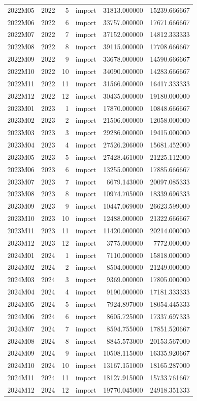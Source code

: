 \begin{tabular}{lrrlrr}
2022M05 & 2022 & 5 & import & 31813.000000 & 15239.666667 \\
2022M06 & 2022 & 6 & import & 33757.000000 & 17671.666667 \\
2022M07 & 2022 & 7 & import & 37152.000000 & 14812.333333 \\
2022M08 & 2022 & 8 & import & 39115.000000 & 17708.666667 \\
2022M09 & 2022 & 9 & import & 33678.000000 & 14590.666667 \\
2022M10 & 2022 & 10 & import & 34090.000000 & 14283.666667 \\
2022M11 & 2022 & 11 & import & 31566.000000 & 16417.333333 \\
2022M12 & 2022 & 12 & import & 30435.000000 & 19180.000000 \\
2023M01 & 2023 & 1 & import & 17870.000000 & 10848.666667 \\
2023M02 & 2023 & 2 & import & 21506.000000 & 12058.000000 \\
2023M03 & 2023 & 3 & import & 29286.000000 & 19415.000000 \\
2023M04 & 2023 & 4 & import & 27526.206000 & 15681.452000 \\
2023M05 & 2023 & 5 & import & 27428.461000 & 21225.112000 \\
2023M06 & 2023 & 6 & import & 13255.000000 & 17885.666667 \\
2023M07 & 2023 & 7 & import & 6679.143000 & 20097.085333 \\
2023M08 & 2023 & 8 & import & 10974.705000 & 18339.696333 \\
2023M09 & 2023 & 9 & import & 10447.069000 & 26623.599000 \\
2023M10 & 2023 & 10 & import & 12488.000000 & 21322.666667 \\
2023M11 & 2023 & 11 & import & 11420.000000 & 20214.000000 \\
2023M12 & 2023 & 12 & import & 3775.000000 & 7772.000000 \\
2024M01 & 2024 & 1 & import & 7110.000000 & 15818.000000 \\
2024M02 & 2024 & 2 & import & 8504.000000 & 21249.000000 \\
2024M03 & 2024 & 3 & import & 9369.000000 & 17805.000000 \\
2024M04 & 2024 & 4 & import & 9190.000000 & 17181.333333 \\
2024M05 & 2024 & 5 & import & 7924.897000 & 18054.445333 \\
2024M06 & 2024 & 6 & import & 8605.725000 & 17337.697333 \\
2024M07 & 2024 & 7 & import & 8594.755000 & 17851.520667 \\
2024M08 & 2024 & 8 & import & 8845.573000 & 20153.567000 \\
2024M09 & 2024 & 9 & import & 10508.115000 & 16335.920667 \\
2024M10 & 2024 & 10 & import & 13167.151000 & 18165.287000 \\
2024M11 & 2024 & 11 & import & 18127.915000 & 15733.761667 \\
2024M12 & 2024 & 12 & import & 19770.045000 & 24918.351333 \\
\bottomrule
\end{tabular}
